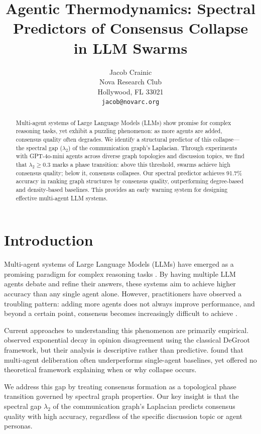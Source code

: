 \documentclass[10pt]{article}
\title{Agentic Thermodynamics: Spectral Predictors of Consensus Collapse in LLM Swarms}
\author{\name Jacob Crainic \\
\addr Nova Research Club \\
\addr Hollywood, FL 33021 \\
\texttt{jacob@novarc.org}}
\begin{document}
\maketitle

\begin{abstract}
Multi-agent systems of Large Language Models (LLMs) show promise for complex reasoning tasks, yet exhibit a puzzling phenomenon: as more agents are added, consensus quality often degrades. We identify a structural predictor of this collapse---the spectral gap (\(\lambda_2\)) of the communication graph's Laplacian. Through experiments with GPT-4o-mini agents across diverse graph topologies and discussion topics, we find that \(\lambda_2 \geq 0.3\) marks a phase transition: above this threshold, swarms achieve high consensus quality; below it, consensus collapses. Our spectral predictor achieves 91.7\% accuracy in ranking graph structures by consensus quality, outperforming degree-based and density-based baselines. This provides an early warning system for designing effective multi-agent LLM systems.
\end{abstract}

\section{Introduction}

Multi-agent systems of Large Language Models (LLMs) have emerged as a promising paradigm for complex reasoning tasks \citep{du2023improving, liang2023encouraging}. By having multiple LLM agents debate and refine their answers, these systems aim to achieve higher accuracy than any single agent alone. However, practitioners have observed a troubling pattern: adding more agents does not always improve performance, and beyond a certain point, consensus becomes increasingly difficult to achieve \citep{kaushal2026deliberationbench}.

Current approaches to understanding this phenomenon are primarily empirical. \citet{yazici2026consensus} observed exponential decay in opinion disagreement using the classical DeGroot framework, but their analysis is descriptive rather than predictive. \citet{kaushal2026deliberationbench} found that multi-agent deliberation often underperforms single-agent baselines, yet offered no theoretical framework explaining when or why collapse occurs.

We address this gap by treating consensus formation as a topological phase transition governed by spectral graph properties. Our key insight is that the spectral gap \(\lambda_2\) of the communication graph's Laplacian predicts consensus quality with high accuracy, regardless of the specific discussion topic or agent personas.
\end{document}
